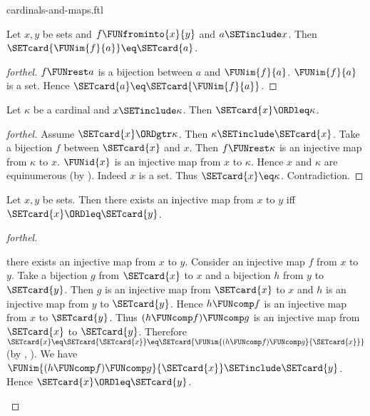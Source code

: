\documentclass{naproche-library}
\begin{document}
\begin{smodule}[title=Cardinal Numbers and Maps]{cardinals-and-maps.ftl}

\begin{proposition}[forthel,id=SET_THEORY_06_5513850721927168]
  Let $x, y$ be sets and $f \FUNfrominto{x}{y}$ and $a \SETinclude x$.
  Then $\SETcard{\FUNim{f}{a}} \eq \SETcard{a}$.
\end{proposition}
\begin{proof}[forthel]
  $f \FUNrest a$ is a bijection between $a$ and $\FUNim{f}{a}$.
  $\FUNim{f}{a}$ is a set.
  Hence $\SETcard{a} \eq \SETcard{\FUNim{f}{a}}$.
\end{proof}

\begin{proposition}[forthel,id=SET_THEORY_06_6702394681735923]
  Let $\kappa$ be a cardinal and $x \SETinclude \kappa$.
  Then $\SETcard{x} \ORDleq \kappa$.
\end{proposition}
\begin{proof}[forthel]
  Assume $\SETcard{x} \ORDgtr \kappa$.
  Then $\kappa \SETinclude \SETcard{x}$.
  Take a bijection $f$ between $\SETcard{x}$ and $x$.
  Then $f \FUNrest \kappa$ is an injective map from $\kappa$ to $x$.
  $\FUNid{x}$ is an injective map from $x$ to $\kappa$.
  Hence $x$ and $\kappa$ are equinumerous (by ).
  Indeed $x$ is a set.
  Thus $\SETcard{x} \eq \kappa$.
  Contradiction.
\end{proof}

\begin{proposition}[forthel,id=SET_THEORY_06_407116133171200]
  Let $x, y$ be sets.
  Then there exists an injective map from $x$ to $y$ iff $\SETcard{x} \ORDleq \SETcard{y}$.
\end{proposition}
\begin{proof}[forthel]
  \begin{case}{there exists an injective map from $x$ to $y$.}
    Consider an injective map $f$ from $x$ to $y$.
    Take a bijection $g$ from $\SETcard{x}$ to $x$ and a bijection $h$ from $y$ to $\SETcard{y}$.
    Then $g$ is an injective map from $\SETcard{x}$ to $x$ and $h$ is an injective map from $y$ to $\SETcard{y}$.
    Hence $h \FUNcomp f$ is an injective map from $x$ to $\SETcard{y}$.
    Thus $(h \FUNcomp f) \FUNcomp g$ is an injective map from $\SETcard{x}$ to $\SETcard{y}$.
    Therefore $\SETcard{x}
      \eq \SETcard{\SETcard{x}}
      \eq \SETcard{\FUNim{(h \FUNcomp f) \FUNcomp g}{\SETcard{x}}}$
    (by , ).
    We have $\FUNim{(h \FUNcomp f) \FUNcomp g}{\SETcard{x}} \SETinclude \SETcard{y}$.
    Hence $\SETcard{x} \ORDleq \SETcard{y}$.
  \end{case}


\end{proof}
\end{smodule}
\end{document}
